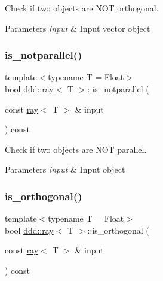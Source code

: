 Check if two objects are N\+OT orthogonal. 


\begin{DoxyParams}{Parameters}
{\em input} & Input vector object \\
\hline
\end{DoxyParams}
\mbox{\label{classddd_1_1ray_a71ecf77ee2921224588b6124f3ab30ab}} 
\subsubsection{\texorpdfstring{is\+\_\+notparallel()}{is\_notparallel()}}
{\footnotesize\ttfamily template$<$typename T = Float$>$ \\
bool \hyperlink{classddd_1_1ray}{ddd\+::ray}$<$ T $>$\+::is\+\_\+notparallel (\begin{DoxyParamCaption}\item[{const \hyperlink{classddd_1_1ray}{ray}$<$ T $>$ \&}]{input }\end{DoxyParamCaption}) const\hspace{0.3cm}{\ttfamily [inline]}}



Check if two objects are N\+OT parallel. 


\begin{DoxyParams}{Parameters}
{\em input} & Input object \\
\hline
\end{DoxyParams}
\mbox{\label{classddd_1_1ray_a669c71b72c7222adae9fab86795e7305}} 
\subsubsection{\texorpdfstring{is\+\_\+orthogonal()}{is\_orthogonal()}}
{\footnotesize\ttfamily template$<$typename T = Float$>$ \\
bool \hyperlink{classddd_1_1ray}{ddd\+::ray}$<$ T $>$\+::is\+\_\+orthogonal (\begin{DoxyParamCaption}\item[{const \hyperlink{classddd_1_1ray}{ray}$<$ T $>$ \&}]{input }\end{DoxyParamCaption}) const\hspace{0.3cm}{\ttfamily [inline]}}



